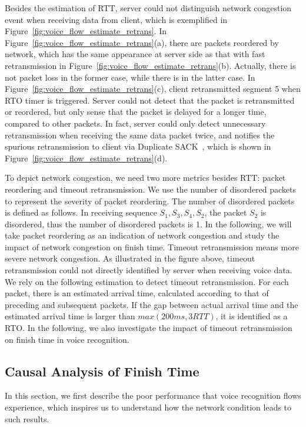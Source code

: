 Besides the estimation of RTT, server could not distinguish network congestion event when receiving data from client, which is exemplified in Figure~\ref{fig:voice_flow_estimate_retrans}. In Figure~\ref{fig:voice_flow_estimate_retrans}(a), there are packets reordered by network, which has the same appearance at server side as that with fast retransmission in Figure~\ref{fig:voice_flow_estimate_retrans}(b). Actually, there is not packet loss in the former case, while there is in the latter case. In Figure~\ref{fig:voice_flow_estimate_retrans}(c), client retransmitted segment 5 when RTO timer is triggered. Server could not detect that the packet is retransmitted or reordered, but only sense that the packet is delayed for a longer time, compared to other packets. In fact, server could only detect unnecessary retransmission when receiving the same data packet twice, and notifies the spurious retransmission to client via Duplicate SACK~\cite{rfc3078}, which is shown in Figure~\ref{fig:voice_flow_estimate_retrans}(d).

To depict network congestion, we need two more metrics besides RTT: packet reordering and timeout retransmission. We use the number of disordered packets to represent the severity of packet reordering. The number of disordered packets is defined as follows. In receiving sequence $S_1, S_3, S_4, S_2$, the packet $S_2$ is disordered, thus the number of disordered packets is 1. In the following, we will take packet reordering as an indication of network congestion and study the impact of network congestion on finish time. Timeout retransmission means more severe network congestion. As illustrated in the figure above, timeout retransmission could not directly identified by server when receiving voice data. We rely on the following estimation to detect timeout retransmission. For each packet, there is an estimated arrival time, calculated according to that of preceding and subsequent packets. If the gap between actual arrival time and the estimated arrival time is larger than $max(200ms, 3 RTT)$, it is identified as a RTO. In the following, we also investigate the impact of timeout retransmission on finish time in voice recognition.

\subsection{Causal Analysis of Finish Time}

In this section, we first describe the poor performance that voice recognition flows experience, which inspires us to understand how the network condition leads to such results.

